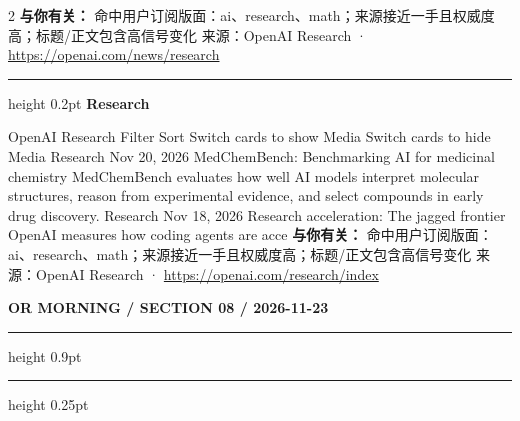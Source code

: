 \documentclass[10.5pt]{ctexart}
\begin{document}
\begin{multicols}{2}
\textbf{与你有关：} 命中用户订阅版面：ai、research、math；来源接近一手且权威度高；标题/正文包含高信号变化
{\footnotesize\color{ormuted} 来源：OpenAI Research · \url{https://openai.com/news/research}}
\vspace{2mm}
\hrule height 0.2pt
\vspace{2mm}
{\large\bfseries Research}\par
OpenAI Research Filter Sort Switch cards to show Media Switch cards to hide Media Research Nov 20, 2026 MedChemBench: Benchmarking AI for medicinal chemistry MedChemBench evaluates how well AI models interpret molecular structures, reason from experimental evidence, and select compounds in early drug discovery. Research Nov 18, 2026 Research acceleration: The jagged frontier OpenAI measures how coding agents are acce
\textbf{与你有关：} 命中用户订阅版面：ai、research、math；来源接近一手且权威度高；标题/正文包含高信号变化
{\footnotesize\color{ormuted} 来源：OpenAI Research · \url{https://openai.com/research/index}}
\end{multicols}
\newpage
{\small\bfseries OR MORNING / SECTION 08 / 2026-11-23}
\vspace{2mm}
\hrule height 0.9pt
\vspace{1.5mm}
\hrule height 0.25pt
\vspace{4mm}
\end{document}
